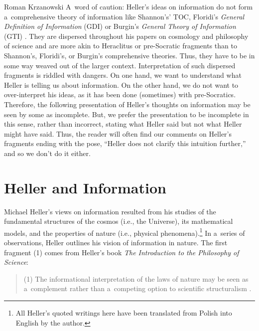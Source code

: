 \begin{artengenv}{Roman Krzanowski}
A~word of caution: Heller's ideas on information do not form a~comprehensive theory of information like Shannon's' TOC, Floridi's \textit{General Definition of Information} (GDI) 
\parencite[see e.g][]{floridi_philosophy_2011} %
 or Burgin's \textit{General Theory of Information} (GTI) 
\parencite[][]{burgin_information_2003}. %
 They are dispersed throughout his papers on cosmology and philosophy of science and are more akin to Heraclitus or pre-Socratic fragments than to Shannon's, Floridi's, or Burgin's comprehensive theories. Thus, they have to be in some way weaved out of the larger context. Interpretation of such dispersed fragments is riddled with dangers. On one hand, we want to understand what Heller is telling us about information. On the other hand, we do not want to over-interpret his ideas, as it has been done (sometimes) with pre-Socratics. Therefore, the following presentation of Heller's thoughts on information may be seen by some as incomplete. But, we prefer the presentation to be incomplete in this sense, rather than incorrect, stating what Heller said but not what Heller might have said. Thus, the reader will often find our comments on Heller's fragments ending with the pose, ``Heller does not clarify this intuition further,'' and so we don't do it either.



\section{Heller and Information}

Michael Heller's views on information resulted from his studies of the fundamental structures of the cosmos (i.e., the Universe), its mathematical models, and the properties of nature (i.e., physical phenomena).\footnote{All Heller's quoted writings here have been translated from Polish into English by the author.} In a~series of observations, Heller outlines his vision of information in nature. The first fragment (1) comes from Heller's book \textit{The Introduction to the Philosophy of Science}:



\begin{quote}
(1) The informational interpretation of the laws of nature may be seen as a~complement rather than a~competing option to scientific structuralism 
\parencite[][pp.62–63]{heller_filozofia_2009}.%
\end{quote}





\end{artengenv}
